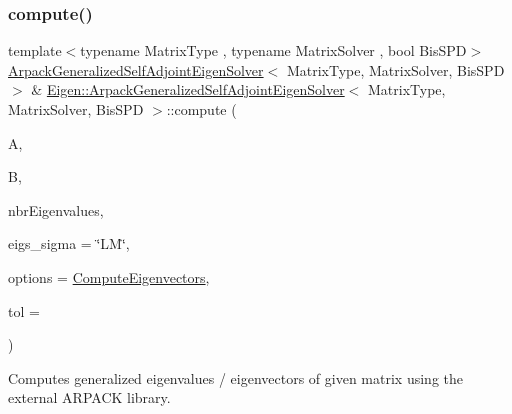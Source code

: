 \subsubsection{\texorpdfstring{compute()}{compute()}\hspace{0.1cm}{\footnotesize\ttfamily [1/4]}}
{\footnotesize\ttfamily template$<$typename Matrix\+Type , typename Matrix\+Solver , bool Bis\+S\+PD$>$ \\
\hyperlink{class_eigen_1_1_arpack_generalized_self_adjoint_eigen_solver}{Arpack\+Generalized\+Self\+Adjoint\+Eigen\+Solver}$<$ Matrix\+Type, Matrix\+Solver, Bis\+S\+PD $>$ \& \hyperlink{class_eigen_1_1_arpack_generalized_self_adjoint_eigen_solver}{Eigen\+::\+Arpack\+Generalized\+Self\+Adjoint\+Eigen\+Solver}$<$ Matrix\+Type, Matrix\+Solver, Bis\+S\+PD $>$\+::compute (\begin{DoxyParamCaption}\item[{const Matrix\+Type \&}]{A,  }\item[{const Matrix\+Type \&}]{B,  }\item[{Index}]{nbr\+Eigenvalues,  }\item[{std\+::string}]{eigs\+\_\+sigma = {\ttfamily \char`\"{}LM\char`\"{}},  }\item[{int}]{options = {\ttfamily \hyperlink{group__enums_ggae3e239fb70022eb8747994cf5d68b4a9ada93d8885bde32b876ba4af01d3292cc}{Compute\+Eigenvectors}},  }\item[{\hyperlink{class_eigen_1_1_arpack_generalized_self_adjoint_eigen_solver_a2555af55e53bf9de894a49e639be2e1e}{Real\+Scalar}}]{tol = {} }\end{DoxyParamCaption})}



Computes generalized eigenvalues / eigenvectors of given matrix using the external A\+R\+P\+A\+CK library. 


